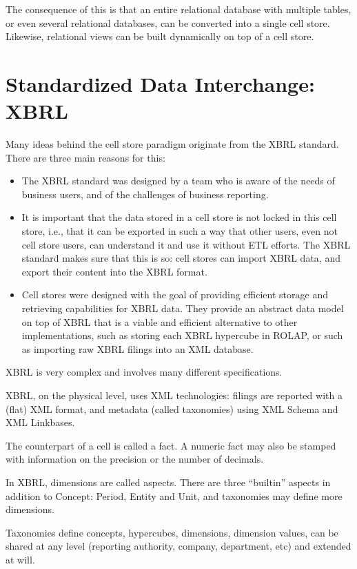 \documentclass{vldb}
\begin{document}
The consequence of this is that an entire relational database with multiple tables, or even several relational databases, can be converted into a single cell store. Likewise, relational views can be built dynamically on top of a cell store.

\section{Standardized Data Interchange: XBRL}

Many ideas behind the cell store paradigm originate from the XBRL standard. There are three main reasons for this:

\begin{itemize}
\item The XBRL standard was designed by a team who is aware of the needs of business users, and of the challenges of business reporting.
\item It is important that the data stored in a cell store is not locked in this cell store, i.e., that it can be exported in such a way that other users, even not cell store users, can understand it and use it without ETL efforts. The XBRL standard makes sure that this is so: cell stores can import XBRL data, and export their content into the XBRL format.
\item Cell stores were designed with the goal of providing efficient storage and retrieving capabilities for XBRL data. They provide an abstract data model on top of XBRL that is a viable and efficient alternative to other implementations, such as storing each XBRL hypercube in ROLAP, or such as importing raw XBRL filings into an XML database.
\end{itemize}

XBRL is very complex and involves many different specifications.

XBRL, on the physical level, uses XML technologies: filings are reported with a (flat) XML format, and metadata (called taxonomies) using XML Schema and XML Linkbases.

The counterpart of a cell is called a fact. A numeric fact may also be stamped with information on the precision or the number of decimals.

In XBRL, dimensions are called aspects. There are three ``builtin'' aspects in addition to Concept: Period, Entity and Unit, and taxonomies may define more dimensions.

Taxonomies define concepts, hypercubes, dimensions, dimension values, can be shared at any level (reporting authority, company, department, etc) and extended at will.
\end{document}
